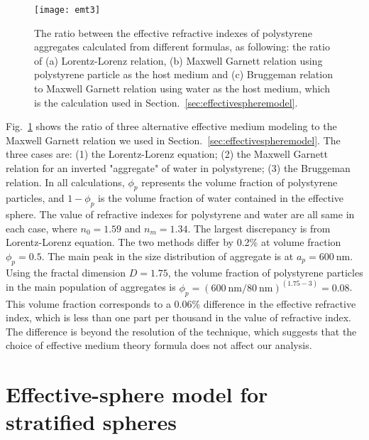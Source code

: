 \begin{figure}[!t]
  \centering
  \texttt{[image: emt3]}
  \caption[Effective medium theory comparison]
    {The ratio between the effective refractive indexes of polystyrene aggregates 
    calculated from different formulas, as following: the ratio of (a) Lorentz-Lorenz 
    relation, (b) Maxwell Garnett relation using polystyrene particle as the host medium 
    and (c) Bruggeman relation to Maxwell Garnett relation using water as the host 
    medium, which is the calculation used in Section.~\ref{sec:effectivespheremodel}.}
  \label{fig:emt3}
\end{figure}

Fig.~\ref{fig:emt3} shows the ratio of three alternative effective medium modeling to the 
Maxwell Garnett relation we used in Section.~\ref{sec:effectivespheremodel}. The three 
cases are: (1) the Lorentz-Lorenz equation; (2) the Maxwell Garnett 
relation for an inverted "aggregate" of water in polystyrene; 
(3) the Bruggeman relation. 
In all calculations, $\phi_p$ represents the volume fraction of polystyrene particles, and $1-\phi_p$ is the volume fraction of water 
contained in the effective sphere. 
The value of refractive indexes for polystyrene and water are all same in each 
case, where $n_0 = 1.59$ and $n_m = 1.34$. The largest discrepancy is from Lorentz-Lorenz equation. The two methods differ by 0.2\% at volume fraction $\phi_p = 0.5$. The main peak in the size distribution of aggregate is at $a_p = \SI{600}{\nm}$. Using the fractal dimension $D = 1.75$, the volume fraction of polystyrene particles in the main population of aggregates is $\phi_p = (\SI{600}{\nm}/\SI{80}{\nm}) ^ {(1.75 - 3)} = 0.08$. This volume fraction corresponds to a 0.06\% difference in the effective refractive index, which is less than one part per thousand in the value of refractive index. The difference is beyond the resolution of the technique, which suggests that the choice of effective medium theory formula does not affect our analysis.

\section{Effective-sphere model for stratified spheres}
\label{sec:gradientindexspheres}

